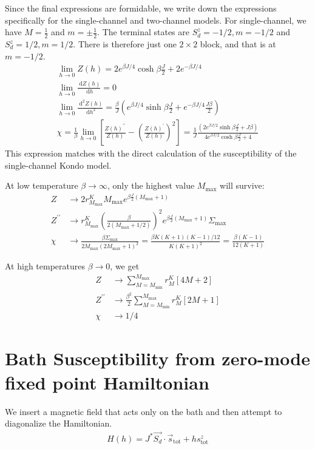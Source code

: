 \documentclass{revtex4-2}
\begin{document}
Since the final expressions are formidable, we write down the expressions specifically for the single-channel and two-channel models. For single-channel, we have \(M=\frac{1}{2}\) and \(m = \pm \frac{1}{2}\). The terminal states are \(S_d^z=-1/2, m=-1/2\) and \(S_d^z=1/2, m=1/2\). There is therefore just one \(2\times 2\) block, and that is at \(m=-1/2\).
\begin{gather}
	\lim_{h \to 0}Z(h) = 2e^{\beta J/4}\cosh \beta \frac{J}{2} + 2e^{-\beta J/4} \\
	\lim_{h \to 0}\frac{\:\mathrm{d}Z(h)}{\:\mathrm{d}h} = 0 \\
	\lim_{h \to 0}\frac{\:\mathrm{d}^2Z(h)}{\:\mathrm{d}h^2} = \frac{\beta}{J}\left(e^{\beta J/4}\sinh \beta\frac{J}{2} + e^{-\beta J/4}\frac{J \beta}{2}\right)\\
	\chi = \frac{1}{\beta}\lim_{h \to 0}\left[\frac{Z(h)^{\prime\prime}}{Z(h)} - \left(\frac{Z(h)^{\prime}}{Z(h)}\right)^2 \right] = \frac{1}{J}\frac{\left(2e^{\beta J/2}\sinh \beta\frac{J}{2} + J \beta\right)}{4e^{\beta J/2}\cosh \beta \frac{J}{2} + 4}
\end{gather}
This expression matches with the direct calculation of the susceptibility of the single-channel Kondo model.

At low temperature \(\beta \to \infty\), only the highest value \(M_\text{max}\) will survive:
\begin{align}
	Z &\to 2 r^K_{M_\text{max}} M_\text{max} e^{\beta \frac{J}{2}(M_\text{max} + 1)}\\
	Z^{\prime \prime} &\to r^K_{M_\text{max}}\left(\frac{\beta }{2(M_\text{max} + 1/2)}\right)^2 e^{\beta \frac{J}{2}(M_\text{max} + 1)}\Sigma_\text{max}\\
	\chi &\to \frac{\beta\Sigma_\text{max}}{2M_\text{max}\left(2M_\text{max}+1\right)^2} = \frac{\beta K(K+1)(K-1)/12}{K(K+1)^2} = \frac{\beta(K-1)}{12(K+1)}
\end{align}

At high temperatures \(\beta \to 0\), we get
\begin{align}
	Z &\to \sum_{M=M_\text{min}}^{M_\text{max}}r^K_M\left[4M + 2\right]\\
	Z^{\prime \prime} &\to \frac{\beta^2}{2}\sum_{M=M_\text{min}}^{M_\text{max}}r^K_M\left[2M + 1\right]\\
	\chi &\to 1/4
\end{align}

\section{Bath Susceptibility from zero-mode fixed point Hamiltonian}
We insert a magnetic field that acts only on the bath and then attempt to diagonalize the Hamiltonian.
\begin{align}
	H(h) = J^* \vec{S_d}\cdot\vec{s}_\text{tot} + h s^z_\text{tot}
\end{align}
\end{document}

